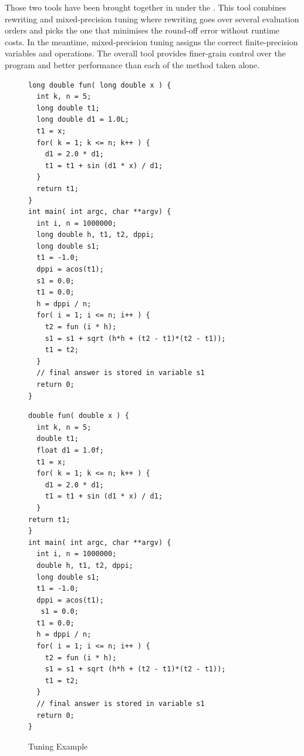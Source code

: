Those two tools have been brought together in \cite{Darulova2018} under the . This tool combines rewriting and mixed-precision tuning where rewriting goes over several evaluation orders and picks the one that minimises the round-off error without runtime costs. In the meantime, mixed-precision tuning assigns the correct finite-precision variables and operations. The overall tool provides finer-grain control over the program and better performance than each of the method taken alone.
\begin{figure}[htbp]
\centering
\begin{minipage}{.48\textwidth}
\begin{lstlisting}[style=CInputStyle]
long double fun( long double x ) {
  int k, n = 5;
  long double t1;
  long double d1 = 1.0L;
  t1 = x;
  for( k = 1; k <= n; k++ ) {
    d1 = 2.0 * d1;
    t1 = t1 + sin (d1 * x) / d1;
  }
  return t1;
}
int main( int argc, char **argv) {
  int i, n = 1000000;
  long double h, t1, t2, dppi;
  long double s1;
  t1 = -1.0;
  dppi = acos(t1);
  s1 = 0.0;
  t1 = 0.0;
  h = dppi / n;
  for( i = 1; i <= n; i++ ) {
    t2 = fun (i * h);
    s1 = s1 + sqrt (h*h + (t2 - t1)*(t2 - t1));
    t1 = t2;
  }
  // final answer is stored in variable s1
  return 0;
}
\end{lstlisting}
\end{minipage}
\hfill
\begin{minipage}{.48\textwidth}
\begin{lstlisting}[style=CInputStyle]
double fun( double x ) {
  int k, n = 5;
  double t1;
  float d1 = 1.0f;
  t1 = x;
  for( k = 1; k <= n; k++ ) {
    d1 = 2.0 * d1;
    t1 = t1 + sin (d1 * x) / d1;
  }
return t1;
}
int main( int argc, char **argv) {
  int i, n = 1000000;
  double h, t1, t2, dppi;
  long double s1;
  t1 = -1.0;
  dppi = acos(t1);
   s1 = 0.0;
  t1 = 0.0;
  h = dppi / n;
  for( i = 1; i <= n; i++ ) {
    t2 = fun (i * h);
    s1 = s1 + sqrt (h*h + (t2 - t1)*(t2 - t1));
    t1 = t2;
  }
  // final answer is stored in variable s1
  return 0;
}
\end{lstlisting}
\end{minipage}
\caption[Tuning]{Tuning Example \cite{Rubio2013}}
	\label{fig:Tuning}
\end{figure}


